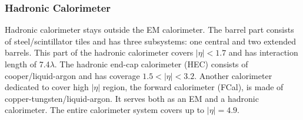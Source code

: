 \subsubsection{Hadronic Calorimeter}

Hadronic calorimeter stays outside the EM calorimeter. The barrel part consists of steel/scintillator tiles and has three subsystems: one central and two extended barrels. This part of the hadronic calorimeter covers $|\eta|<1.7$ and has interaction length of 7.4$\lambda$. The hadronic end-cap calorimeter (HEC) consists of cooper/liquid-argon and has coverage $1.5<|\eta|<3.2$. Another calorimeter dedicated to cover high $|\eta|$ region, the forward calorimeter (FCal), is made of copper-tungsten/liquid-argon. It serves both as an EM and a hadronic calorimeter. The entire calorimeter system covers up to $|\eta|=4.9$.




